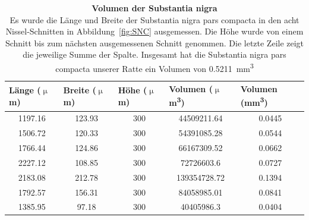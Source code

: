 \documentclass[12pt,a4paper,pdftex]{article}
\begin{document}
\begin{table}[H]
\centering
\caption[Tabelle zum Volumen der Substantia nigra]{\textbf{Volumen der Substantia nigra}\\ Es wurde die Länge und Breite der Substantia nigra pars compacta in den acht Nissel-Schnitten in Abbildung~\ref{fig:SNC} ausgemessen. Die Höhe wurde von einem Schnitt bis zum nächsten ausgemessenen Schnitt genommen. Die letzte Zeile zeigt die jeweilige Summe der Spalte.
Insgesamt hat die Substantia nigra pars compacta unserer Ratte ein Volumen von 0.5211~mm\textsuperscript{3}}
\label{tab:Volumen_SNC}
\begin{tabular}{ccccc}
\multicolumn{1}{l}{\textbf{Länge ($\upmu$m)}} & \multicolumn{1}{l}{\textbf{Breite ($\upmu$m)}} & \multicolumn{1}{l}{\textbf{Höhe ($\upmu$m)}} & \multicolumn{1}{l}{\textbf{Volumen ($\upmu$m\textsuperscript{3})}} & \multicolumn{1}{l}{\textbf{Volumen (mm\textsuperscript{3})}} \\ \hline
1197.16                                 & 123.93                                   & 300                                    & 44509211.64                                & 0.0445                                     \\
1506.72                                 & 120.33                                   & 300                                    & 54391085.28                                & 0.0544                                     \\
1766.44                                 & 124.86                                   & 300                                    & 66167309.52                                & 0.0662                                     \\
2227.12                                 & 108.85                                   & 300                                    & 72726603.6                                 & 0.0727                                     \\
2183.08                                 & 212.78                                   & 300                                    & 139354728.72                               & 0.1394                                     \\
1792.57                                 & 156.31                                   & 300                                    & 84058985.01                                & 0.0841                                     \\
1385.95                                 & 97.18                                    & 300                                    & 40405986.3                                 & 0.0404                                     \\

\end{tabular}
\end{table}
\end{document}
